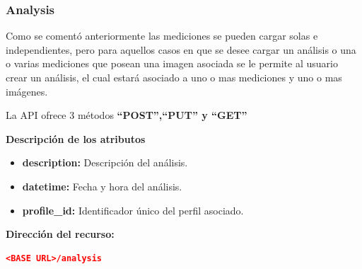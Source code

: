 \documentclass[a4paper,12pt]{article}
\begin{document}
\clearpage

\subsubsection{Analysis}
Como se comentó anteriormente las mediciones se pueden cargar solas e independientes, pero para aquellos casos en que se desee cargar un análisis o una o varias mediciones que posean una imagen asociada se le permite al usuario crear un análisis, el cual estará asociado a uno o mas mediciones y uno o mas imágenes.

La API ofrece 3 métodos \textbf{``POST'',``PUT'' y ``GET''}


\textbf{Descripción de los atributos}
\begin{itemize}
	\item \textbf{description:} Descripción del análisis.
	\item \textbf{datetime: }	Fecha y hora del análisis.	
	\item \textbf{profile\_id: } Identificador único del perfil asociado.
\end{itemize}

\textbf{Dirección del recurso:}
\begin{lstlisting}[language=json,firstnumber=1]
<BASE URL>/analysis
\end{lstlisting}
\end{document}
